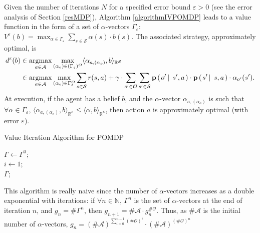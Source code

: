 Given the number of iterations $N$ 
for a specified error bound $\varepsilon>0$ 
(see the error analysis of Section \ref{resMDP}), 
Algorithm \ref{algorithmIVPOMDP}
leads to a value function in the form of a set of $\alpha$-vectors $\Gamma_{\varepsilon}$:
$V^{\varepsilon}(b) = \max_{\alpha \in \Gamma_{\varepsilon}} \sum_{s \in \mathcal{S}} \alpha(s) \cdot b(s)$.
The associated strategy, approximately optimal, is 
\begin{align*}
 d^{\varepsilon}(b) & \in \operatorname*{argmax}_{a \in \mathcal{A}} \max_{ (\alpha_o) \in (\Gamma_{\varepsilon})^{\mathcal{O}}} \langle \alpha_{a,(\alpha_o)}, b \rangle_{\mathbb{R}^{\mathcal{S}}} \\
& \in \operatorname*{argmax}_{a \in \mathcal{A}} \max_{ (\alpha_o) \in \Gamma_{\varepsilon}^{\mathcal{O}}} \sum_{s \in \mathcal{S}} r(s,a) + \gamma \cdot \sum_{o' \in \mathcal{O}} \sum_{s' \in \mathcal{S}} \textbf{p} \left( \left. o' \, \right| \left. \, s',a \right. \right) \cdot \textbf{p} \left( \left.  s' \, \right| \left. \, s ,a   \right. \right) \cdot \alpha_{o'}(s').
\end{align*}
At execution, if the agent has a belief $b$,
and the $\alpha$-vector $\alpha_{a,(\alpha_o)}$ 
is such that $\forall \alpha \in \Gamma_{\varepsilon}$, $\langle \alpha_{a,(\alpha_o)}, b \rangle_{\mathbb{R}^{\mathcal{S}}} \leqslant \langle \alpha , b \rangle_{\mathbb{R}^{\mathcal{S}}}$,
then action $a$ is approximately optimal (with error $\varepsilon$).

\begin{algorithm} \caption{Value Iteration Algorithm for POMDP} 
\label{algorithmIVPOMDP}
$\Gamma \gets \Gamma^0$; \\
$i \gets 1$; \\
\Return $\Gamma$;
\end{algorithm}

This algorithm is really naive since the number of $\alpha$-vectors 
increases as a double exponential with iterations: if $\forall n \in \mathbb{N}$, 
$\Gamma^n$ is the set of $\alpha$-vectors 
at the end of iteration $n$, and $g_n = \# \Gamma^n$, 
then $g_{n+1}=\# \mathcal{A} \cdot g_{n}^{\#\mathcal{O}}$. 
Thus, as $\# \mathcal{A}$ is the initial number of $\alpha$-vectors,
$g_n = (\# \mathcal{A})^{\sum_{i=0}^{n-1} (\# \mathcal{O})^i} \cdot (\# \mathcal{A})^{(\# \mathcal{O})^n}$

